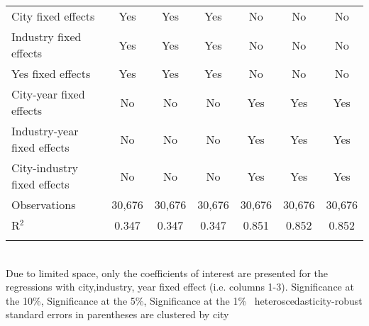 \documentclass[12pt]{article}
\begin{document}
\begin{table}[!htbp]
\begin{adjustbox}{width=\textwidth, totalheight=\baselineskip,keepaspectratio}
\begin{tabular}{@{\extracolsep{5pt}}lcccccc}
City fixed effects & Yes & Yes & Yes & No & No & No \\ 
Industry fixed effects & Yes & Yes & Yes & No & No & No \\ 
Yes fixed effects & Yes & Yes & Yes & No & No & No \\ 
City-year fixed effects & No & No & No & Yes & Yes & Yes \\ 
Industry-year fixed effects & No & No & No & Yes & Yes & Yes \\ 
City-industry fixed effects & No & No & No & Yes & Yes & Yes \\ 
Observations & 30,676 & 30,676 & 30,676 & 30,676 & 30,676 & 30,676 \\ 
R$^{2}$ & 0.347 & 0.347 & 0.347 & 0.851 & 0.852 & 0.852 \\ 
\hline 
\hline \\[-1.8ex] 
\end{tabular}
\end{adjustbox}
\begin{tablenotes} 
 \small 
 \item \\ 
\footnotesize{
Due to limited space, only the coefficients of interest are presented 
for the regressions with city,industry, year fixed effect (i.e. columns 1-3).
\sym{*} Significance at the 10\%, \sym{**} Significance at the 5\%, \sym{***} Significance at the 1\% \
heteroscedasticity-robust standard errors in parentheses are clustered by city 
}
 
\end{tablenotes}
\end{table}
\end{document}
